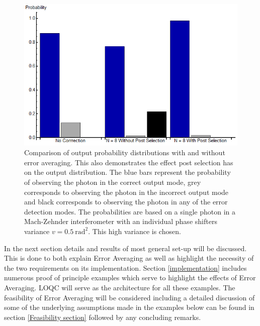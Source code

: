\documentclass[aps,pra,twocolumn,superscriptaddress,numerical]{revtex4-1}
\begin{document}
\begin{figure}
	\begin{centering}
		\includegraphics[width=\columnwidth]{prob_distributions.png}
	\end{centering}
	\caption[Comparison of output probability distributions with and without error averaging.]{Comparison of output probability distributions with and without error 	averaging. This also demonstrates the effect post selection has on the output distribution. The blue bars represent the probability of observing the photon in the correct output mode, grey corresponds to observing the photon in the incorrect output mode and black corresponds to observing the photon in any of the error detection modes. The probabilities are based on a single photon in a Mach-Zehnder interferometer with an individual phase shifters variance $v=0.5\ \textrm{rad}^{2}$. This high variance is chosen.} 
	\label{fig:output_probabilities}
\end{figure}

In the next section details and results of most general set-up will be discussed. This is done to both explain Error Averaging as well as highlight the necessity of the two requirements on its implementation. Section \ref{implementation} includes numerous proof of principle examples which serve to highlight the effects of Error Averaging. LOQC will serve as the architecture for all these examples. The feasibility of Error Averaging will be considered including a detailed discussion of some of the underlying assumptions made in the examples below can be found in section \ref{Feasibility section} followed by any concluding remarks.

\end{document}
